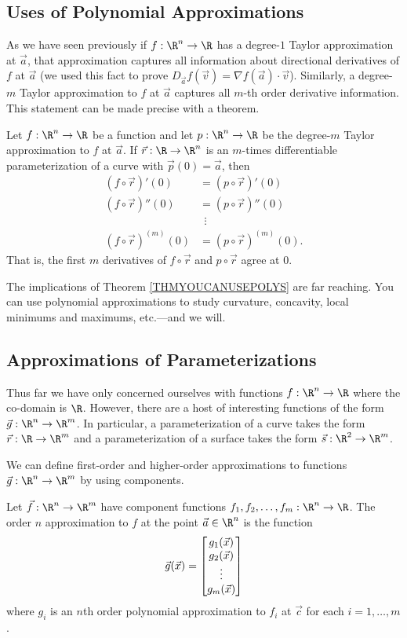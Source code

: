 \subsection{Uses of Polynomial Approximations}
As we have seen previously if $f:\R^n\to\R$
has a degree-$1$ Taylor approximation at $\vec a$,
that approximation captures
all information about directional derivatives of $f$ at $\vec a$ 
(we used this fact to prove $D_{\vec a} f(\vec v)=\nabla f(\vec a)\cdot \vec v$).
Similarly, a degree-$m$ Taylor approximation to $f$ at $\vec a$ captures
all $m$-th order derivative information.  This statement can be made
precise with a theorem.

\begin{theorem}
	\label{THMYOUCANUSEPOLYS}
	Let $f:\R^n\to\R$ be a function and let $p:\R^n\to\R$ be the 
	degree-$m$ Taylor approximation to $f$ at $\vec a$.  If
	$\vec r:\R\to\R^n$ is an
	$m$-times differentiable parameterization of a curve with $\vec p(0)=\vec a$,
	then
	\begin{align*}
		(f\circ \vec r)'(0)&=(p\circ \vec r)'(0)\\
		(f\circ \vec r)''(0)&=(p\circ \vec r)''(0)\\
		&\ \ \vdots \\
		(f\circ \vec r)^{(m)}(0)&=(p\circ \vec r)^{(m)}(0).
	\end{align*}
	That is, the first $m$ derivatives of $f\circ \vec r$ and $p\circ\vec r$ agree
	at $0$.
\end{theorem}

The implications of Theorem \ref{THMYOUCANUSEPOLYS} are far reaching. 
You can use polynomial approximations to study curvature, concavity, local
minimums and maximums, etc.---and we will.

\subsection{Approximations of Parameterizations}
Thus far we have only concerned ourselves with functions $f:\R^n\to\R$
where the co-domain is $\R$.  However, there are a host of interesting
functions of the form $\vec g:\R^n\to\R^m$.  In particular, a parameterization
of a curve takes the form $\vec r:\R\to\R^m$ and a parameterization of
a surface takes the form $\vec s:\R^2\to\R^m$.

We can define first-order and higher-order approximations to functions $\vec g:\R^n\to\R^m$
by using components.

\begin{definition}
	Let $\vec f:\R^n\to\R^m$ have component functions
	$f_1,f_2,\ldots,f_m:\R^n\to\R$.  The order $n$ approximation
	to $f$ at the point $\vec a\in\R^n$ is the function
	\[
		\vec g(\vec x) = \begin{bmatrix}g_1(\vec x)\\g_2(\vec x)\\\vdots\\g_m(\vec x)\end{bmatrix}
	\]
	where $g_i$ is an $n$th order polynomial approximation to $f_i$ at $\vec c$
	for each $i=1,\ldots,m$.
\end{definition}

